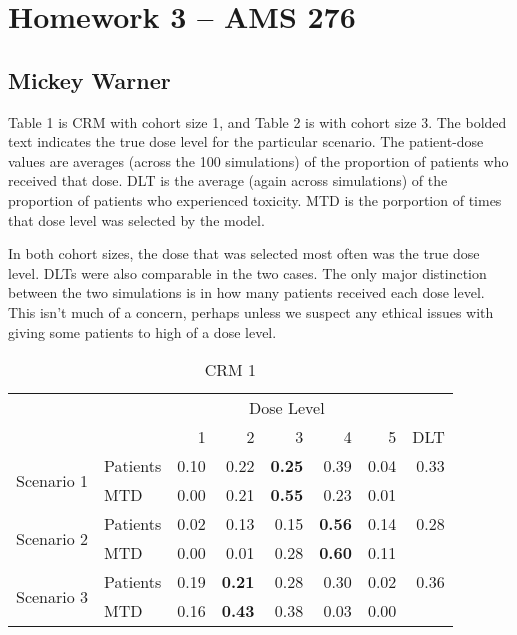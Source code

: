 \documentclass[12pt]{article}
\begin{document}
\section*{Homework 3 -- AMS 276}
\subsection*{Mickey Warner}
\bigskip
\bigskip

\noindent Table 1 is CRM with cohort size 1, and Table 2 is with cohort size 3. The bolded text indicates the true dose level for the particular scenario. The patient-dose values are averages (across the 100 simulations) of the proportion of patients who received that dose. DLT is the average (again across simulations) of the proportion of patients who experienced toxicity. MTD is the porportion of times that dose level was selected by the model.
\bigskip

\noindent In both cohort sizes, the dose that was selected most often was the true dose level. DLTs were also comparable in the two cases. The only major distinction between the two simulations is in how many patients received each dose level. This isn't much of a concern, perhaps unless we suspect any ethical issues with giving some patients to high of a dose level.
\bigskip


\begin{table}[ht]
\begin{center}
\begin{tabular}{llrrrrrr}
\hline\hline
& & \multicolumn{5}{c}{Dose Level} & \\
& & 1 & 2 & 3 & 4 & 5 & DLT \\  \hline
\multirow{2}{*}{Scenario 1} & Patients    & 0.10 & 0.22 & \textbf{0.25} & 0.39 & 0.04 & 0.33 \\
                            & MTD         & 0.00 & 0.21 & \textbf{0.55} & 0.23 & 0.01 &      \\
\multirow{2}{*}{Scenario 2} & Patients    & 0.02 & 0.13 & 0.15 & \textbf{0.56} & 0.14 & 0.28 \\
                            & MTD         & 0.00 & 0.01 & 0.28 & \textbf{0.60} & 0.11 &      \\
\multirow{2}{*}{Scenario 3} & Patients    & 0.19 & \textbf{0.21} & 0.28 & 0.30 & 0.02 & 0.36 \\
                            & MTD         & 0.16 & \textbf{0.43} & 0.38 & 0.03 & 0.00 &      \\
\hline\hline
\end{tabular}
\caption{CRM 1}
\end{center}
\end{table}
\end{document}
